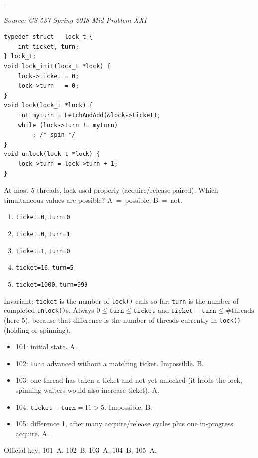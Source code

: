 \documentclass[11pt,a4paper]{article}
\makeatletter
\newcommand{\keepspace}[1]{\par\penalty-100\begingroup
  \setlength{\dimen@}{#1}\dimen@ii\pagegoal\advance\dimen@ii-\pagetotal
  \ifdim\dimen@>\dimen@ii\ifdim\dimen@ii>\z@\vfil\fi\break\fi\endgroup}
\newcounter{qn}[section]
\newenvironment{Qn}[4]{%
  \refstepcounter{qn}\keepspace{7\baselineskip}%
  \begin{tcolorbox}[qboxstyle, title={Q\thesection.\theqn\ \ [#1 \textbar\ #2]\ \ #4}]%
  {\footnotesize\color{g3}\textit{Source: #3}}\par\smallskip%
}{%
  \end{tcolorbox}%
}
\newenvironment{Sol}{%
  \begin{tcolorbox}[sboxstyle, title={Solution}]%
}{%
  \end{tcolorbox}\vspace{0.35em}%
}
\makeatother
\begin{document}
\begin{Qn}{Medium-Hard}{Lect 17}{CS-537 Spring 2018 Mid Problem XXI}{Possible \texttt{(ticket, turn)} pairs}
\begin{lstlisting}[numbers=none]
typedef struct __lock_t {
    int ticket, turn;
} lock_t;
void lock_init(lock_t *lock) {
    lock->ticket = 0;
    lock->turn   = 0;
}
void lock(lock_t *lock) {
    int myturn = FetchAndAdd(&lock->ticket);
    while (lock->turn != myturn)
        ; /* spin */
}
void unlock(lock_t *lock) {
    lock->turn = lock->turn + 1;
}
\end{lstlisting}

At most 5 threads, lock used properly (acquire/release paired). Which simultaneous values are possible? A~=~possible, B~=~not.

\begin{enumerate}
\item[101.] \texttt{ticket=0}, \texttt{turn=0}
\item[102.] \texttt{ticket=0}, \texttt{turn=1}
\item[103.] \texttt{ticket=1}, \texttt{turn=0}
\item[104.] \texttt{ticket=16}, \texttt{turn=5}
\item[105.] \texttt{ticket=1000}, \texttt{turn=999}
\end{enumerate}
\end{Qn}
\begin{Sol}
Invariant: \texttt{ticket} is the number of \texttt{lock()} calls so far; \texttt{turn} is the number of completed \texttt{unlock()}s. Always $0 \le \texttt{turn} \le \texttt{ticket}$ and $\texttt{ticket}-\texttt{turn} \le \#\text{threads}$ (here 5), because that difference is the number of threads currently in \texttt{lock()} (holding or spinning).

\begin{itemize}
\item 101: initial state. A.
\item 102: \texttt{turn} advanced without a matching ticket. Impossible. B.
\item 103: one thread has taken a ticket and not yet unlocked (it holds the lock, spinning waiters would also increase ticket). A.
\item 104: $\texttt{ticket}-\texttt{turn}=11>5$. Impossible. B.
\item 105: difference 1, after many acquire/release cycles plus one in-progress acquire. A.
\end{itemize}

Official key: 101~A, 102~B, 103~A, 104~B, 105~A.
\end{Sol}
\end{document}
